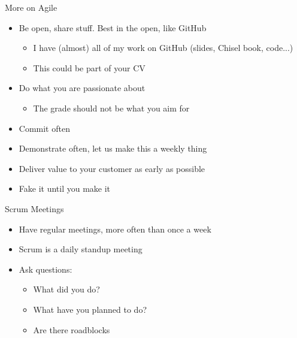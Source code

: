 \begin{frame}[fragile]{More on Agile}
\begin{itemize}
\item Be open, share stuff. Best in the open, like GitHub
\begin{itemize}
\item I have (almost) all of my work on GitHub (slides, Chisel book, code...)
\item This could be part of your CV
\end{itemize}
\item Do what you are passionate about
\begin{itemize}
\item The grade should not be what you aim for
\end{itemize}
\item Commit often
\item Demonstrate often, let us make this a weekly thing
\item Deliver value to your customer as early as possible
\item Fake it until you make it
\end{itemize}
\end{frame}

\begin{frame}[fragile]{Scrum Meetings}
\begin{itemize}
\item Have regular meetings, more often than once a week
\item Scrum is a daily standup meeting
\item Ask questions:
\begin{itemize}
\item What did you do?
\item What have you planned to do?
\item Are there roadblocks
\end{itemize}
\end{itemize}
\end{frame}

